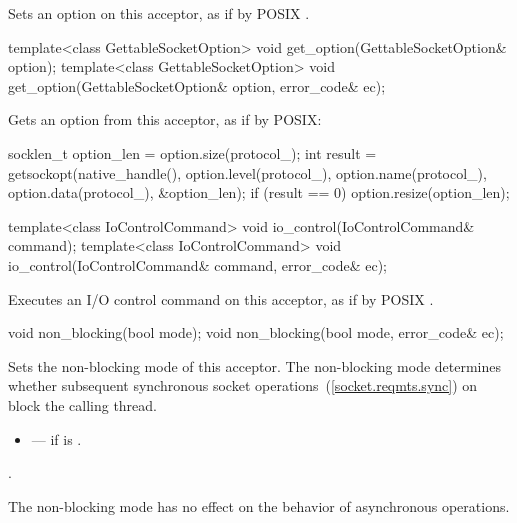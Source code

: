 \begin{itemdescr}
\pnum
\effects Sets an option on this acceptor, as if by POSIX .
\end{itemdescr}

\begin{itemdecl}
template<class GettableSocketOption>
  void get_option(GettableSocketOption& option);
template<class GettableSocketOption>
  void get_option(GettableSocketOption& option, error_code& ec);
\end{itemdecl}

\begin{itemdescr}
\pnum
\effects Gets an option from this acceptor, as if by POSIX: 
\begin{codeblock}
socklen_t option_len = option.size(protocol_);
int result = getsockopt(native_handle(), option.level(protocol_),
                        option.name(protocol_), option.data(protocol_),
                        &option_len);
if (result == 0)
  option.resize(option_len);
\end{codeblock}

\end{itemdescr}

\begin{itemdecl}
template<class IoControlCommand>
  void io_control(IoControlCommand& command);
template<class IoControlCommand>
  void io_control(IoControlCommand& command, error_code& ec);
\end{itemdecl}

\begin{itemdescr}
\pnum
\effects Executes an I/O control command on this acceptor, as if by POSIX .
\end{itemdescr}

\begin{itemdecl}
void non_blocking(bool mode);
void non_blocking(bool mode, error_code& ec);
\end{itemdecl}

\begin{itemdescr}
\pnum
\effects Sets the non-blocking mode of this acceptor. The non-blocking mode determines whether subsequent synchronous socket operations~(\ref{socket.reqmts.sync}) on  block the calling thread.

\pnum
\errors
\begin{itemize}
\item
{} --- if  is .
\end{itemize}

\pnum
\postconditions {}.

\pnum
 \enternote The non-blocking mode has no effect on the behavior of asynchronous operations. \exitnote
\end{itemdescr}

